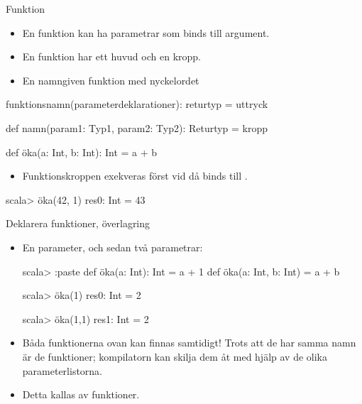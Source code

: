 

\begin{Slide}{Funktion}
\setlength{\leftmargini}{0pt}
\begin{itemize}
  \item En funktion kan ha parametrar som binds till argument.
  \item En funktion har ett huvud och en kropp.
  \item En namngiven funktion  med nyckelordet 
\end{itemize}


 funktionsnamn(parameterdeklarationer): returtyp = uttryck

\vspace{1em}

\begin{Code}
def namn(param1: Typ1, param2: Typ2): Returtyp = kropp
\end{Code}

\pause

\begin{Code}
def öka(a: Int, b: Int): Int = a + b
\end{Code}

\setlength{\leftmargini}{0pt}
\begin{itemize}
  \item Funktionskroppen exekveras först vid  då  binds till .
\end{itemize}

\begin{REPL}
scala> öka(42, 1)
res0: Int = 43
\end{REPL}


\end{Slide}


\begin{Slide}{Deklarera funktioner, överlagring}
\begin{itemize}
\item En parameter, och sedan två parametrar:
\begin{REPL}
scala> :paste
  def öka(a: Int): Int = a + 1
  def öka(a: Int, b: Int) = a + b

scala> öka(1)
res0: Int = 2

scala> öka(1,1)
res1: Int = 2

\end{REPL}
\item Båda funktionerna ovan kan finnas samtidigt! Trots att de har samma namn är de  funktioner; kompilatorn kan skilja dem åt med hjälp av de olika parameterlistorna.

\item Detta kallas   av funktioner.

\end{itemize}
\end{Slide}



